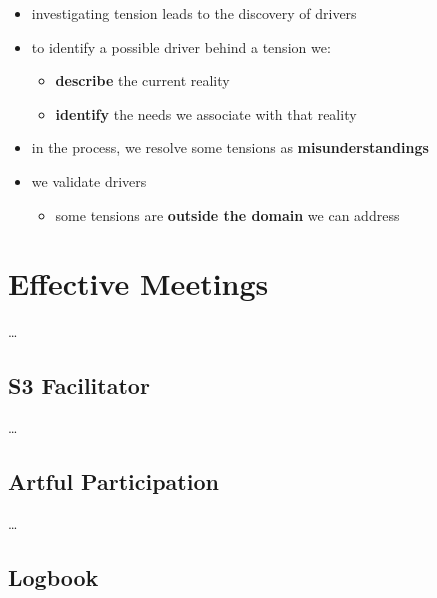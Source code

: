 \begin{itemize}
\item investigating tension leads to the discovery of drivers

\item to identify a possible driver behind a tension we:

\begin{itemize}
\item \textbf{describe} the current reality

\item \textbf{identify} the needs we associate with that reality

\end{itemize}

\item in the process, we resolve some tensions as \textbf{misunderstandings}

\item we validate drivers

\begin{itemize}
\item some tensions are \textbf{outside the domain} we can address

\end{itemize}

\end{itemize}

\chapter{Effective Meetings}
\label{effectivemeetings}

{\ldots}

\section{S3 Facilitator}
\label{s3facilitator}

{\ldots}

\section{Artful Participation}
\label{artfulparticipation}

{\ldots}

\section{Logbook}
\label{logbook}

